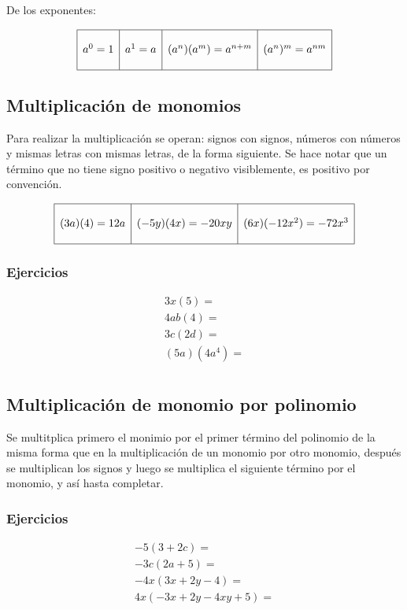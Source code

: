 De los exponentes:
\begin{center}
$$
\begin{array}{|l|l|l|l|}
\hline
 & & & \\
a^0=1 & a^1 = a & (a^n)(a^m)=a^{n+m} & (a^n)^m = a^{nm}\\
 & & & \\
\hline
\end{array}
$$
\end{center}
\subsection{Multiplicación de monomios}
Para realizar la multiplicación se operan: signos con signos, números con números y mismas letras con mismas letras, de la forma siguiente. Se hace notar que un término que no tiene signo positivo o negativo visiblemente, es positivo por convención.
\begin{center}
$$
\begin{array}{|c|c|c|}
\hline
 & & \\
(3a)(4)=12a & (-5y)(4x)=-20xy & (6x)(-12x^2) = -72x^3\\
 & & \\
\hline
\end{array}
$$
\end{center}

\subsubsection{Ejercicios}
$$
\begin{array}{l}
3x(5)=\\
4ab(4)=\\
3c(2d)=\\
(5a)(4a^4)=\\
\end{array}
$$

\subsection{Multiplicación de monomio por polinomio}
Se multitplica primero el monimio por el primer término del polinomio de la misma forma que en la multiplicación de un monomio por otro monomio, después se multiplican los signos y luego se multiplica el siguiente término por el monomio, y así hasta completar.
\subsubsection{Ejercicios}
$$
\begin{array}{l}
-5(3+2c)=\\
-3c(2a+5)=\\
-4x(3x+2y-4)=\\
4x(-3x+2y-4xy+5)=\\
\end{array}	
$$

